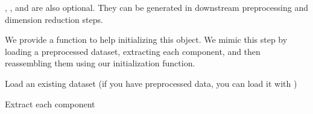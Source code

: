 \documentclass[letterpaper,10pt,english]{sphinxmanual}
\begin{document}
, , and  are also optional. They can be generated in downstream preprocessing and dimension reduction steps.

We provide a function to help initializing this object. We mimic this step by loading a preprocessed dataset, extracting each component, and then re\sphinxhyphen{}assembling them using our initialization function.

Load an existing dataset (if you have pre\sphinxhyphen{}processed data, you can load it with )

{
\begin{sphinxVerbatim}[commandchars=\\\{\}]
\llap{\color{nbsphinxin}[4]:\,\hspace{\fboxrule}\hspace{\fboxsep}}
\end{sphinxVerbatim}
}

Extract each component
\end{document}
